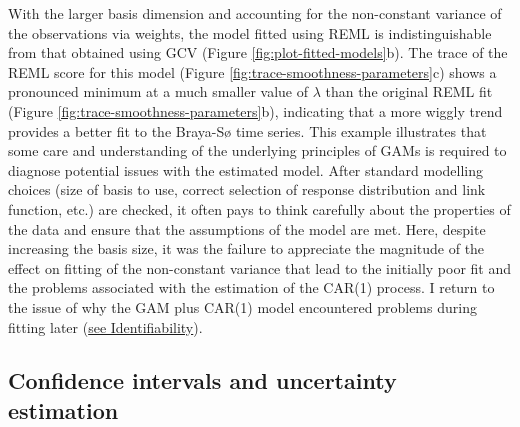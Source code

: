 \documentclass[12pt,]{article}
\begin{document}
With the larger basis dimension and accounting for the non-constant
variance of the observations via weights, the model fitted using REML is
indistinguishable from that obtained using GCV (Figure
\ref{fig:plot-fitted-models}b). The trace of the REML score for this
model (Figure \ref{fig:trace-smoothness-parameters}c) shows a pronounced
minimum at a much smaller value of \(\lambda\) than the original REML
fit (Figure \ref{fig:trace-smoothness-parameters}b), indicating that a
more wiggly trend provides a better fit to the Braya-Sø time series.
This example illustrates that some care and understanding of the
underlying principles of GAMs is required to diagnose potential issues
with the estimated model. After standard modelling choices (size of
basis to use, correct selection of response distribution and link
function, etc.) are checked, it often pays to think carefully about the
properties of the data and ensure that the assumptions of the model are
met. Here, despite increasing the basis size, it was the failure to
appreciate the magnitude of the effect on fitting of the non-constant
variance that lead to the initially poor fit and the problems associated
with the estimation of the CAR(1) process. I return to the issue of why
the GAM plus CAR(1) model encountered problems during fitting later
(\protect\hyperlink{identifiability}{see Identifiability}).

\hypertarget{confints}{\subsection{Confidence intervals and uncertainty
estimation}\label{confints}}
\end{document}
